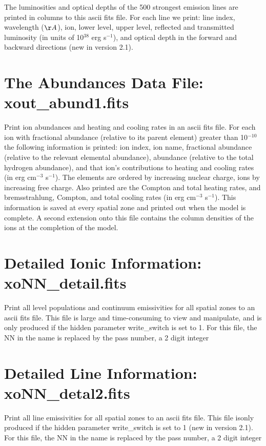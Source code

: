 The luminosities and optical depths of the 500 strongest emission lines 
are printed in columns to 
this ascii fits file.  For each line we
print: line index, wavelength ($\AA$), ion, lower level, upper level, reflected and transmitted 
luminosity (in units of 10$^{38}$ erg s$^{-1}$), and optical 
depth in the forward and backward directions (new in version 2.1). 

\section{The Abundances Data File: xout\_abund1.fits}

Print ion abundances and heating and cooling rates in an ascii fits file. 
For each ion with 
fractional abundance (relative to its parent element) greater than 
10$^{-10}$ the following information is printed: ion index, ion name,
fractional abundance (relative to the relevant elemental abundance),
abundance (relative to the total hydrogen abundance), and that ion's 
contributions to heating and cooling rates (in erg cm$^{-3}$ s$^{-1}$).  
The elements are ordered by increasing nuclear charge, ions by increasing 
free charge. Also printed are the Compton and total
heating rates, and bremsstrahlung, Compton, and total cooling rates 
(in erg cm$^{-3}$ s$^{-1}$).  This information is saved at every spatial zone
and printed out when the model is complete.  A second extension onto this file 
contains the column densities of the ions at the completion of the model.

\section{Detailed Ionic Information: xoNN\_detail.fits}

Print all level populations and continuum emissivities
for all spatial zones to an ascii fits file.
This file is large and time-consuming to view and 
manipulate, and is only produced if the hidden 
parameter write\_switch is set to 1.
For this file, the NN in the name is replaced by the pass number,
a 2 digit integer

\section{Detailed Line Information: xoNN\_detal2.fits}

Print all line emissivities
for all spatial zones to an ascii fits file.
This file isonly produced if the hidden 
parameter write\_switch is set to 1  (new in version 2.1).
For this file, the NN in the name is replaced by the pass number,
a 2 digit integer


